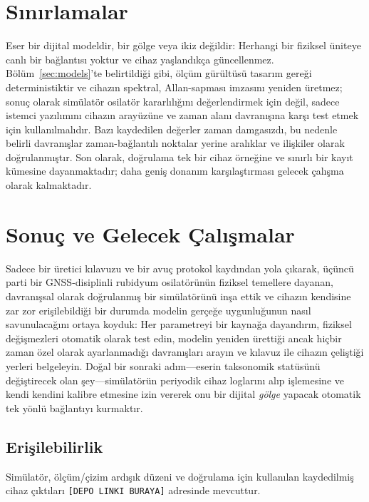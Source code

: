 \documentclass[9pt,twocolumn,a4paper]{extarticle}
\begin{document}
\section{Sınırlamalar}
Eser bir dijital modeldir, bir gölge veya ikiz değildir: Herhangi bir fiziksel üniteye canlı bir bağlantısı yoktur ve cihaz yaşlandıkça güncellenmez. Bölüm~\ref{sec:models}'te belirtildiği gibi, ölçüm gürültüsü tasarım gereği deterministiktir ve cihazın spektral, Allan-sapması imzasını yeniden üretmez; sonuç olarak simülatör osilatör kararlılığını değerlendirmek için değil, sadece istemci yazılımını cihazın arayüzüne ve zaman alanı davranışına karşı test etmek için kullanılmalıdır. Bazı kaydedilen değerler zaman damgasızdı, bu nedenle belirli davranışlar zaman-bağlantılı noktalar yerine aralıklar ve ilişkiler olarak doğrulanmıştır. Son olarak, doğrulama tek bir cihaz örneğine ve sınırlı bir kayıt kümesine dayanmaktadır; daha geniş donanım karşılaştırması gelecek çalışma olarak kalmaktadır.

\section{Sonuç ve Gelecek Çalışmalar}
Sadece bir üretici kılavuzu ve bir avuç protokol kaydından yola çıkarak, üçüncü parti bir GNSS-disiplinli rubidyum osilatörünün fiziksel temellere dayanan, davranışsal olarak doğrulanmış bir simülatörünü inşa ettik ve cihazın kendisine zar zor erişilebildiği bir durumda modelin gerçeğe uygunluğunun nasıl savunulacağını ortaya koyduk: Her parametreyi bir kaynağa dayandırın, fiziksel değişmezleri otomatik olarak test edin, modelin yeniden ürettiği ancak hiçbir zaman özel olarak ayarlanmadığı davranışları arayın ve kılavuz ile cihazın çeliştiği yerleri belgeleyin. Doğal bir sonraki adım---eserin taksonomik statüsünü değiştirecek olan şey---simülatörün periyodik cihaz loglarını alıp işlemesine ve kendi kendini kalibre etmesine izin vererek onu bir dijital \emph{gölge} yapacak otomatik tek yönlü bağlantıyı kurmaktır.

\subsection*{Erişilebilirlik}
Simülatör, ölçüm/çizim ardışık düzeni ve doğrulama için kullanılan kaydedilmiş cihaz çıktıları
\texttt{[DEPO LINKI BURAYA]} adresinde mevcuttur.
\end{document}
